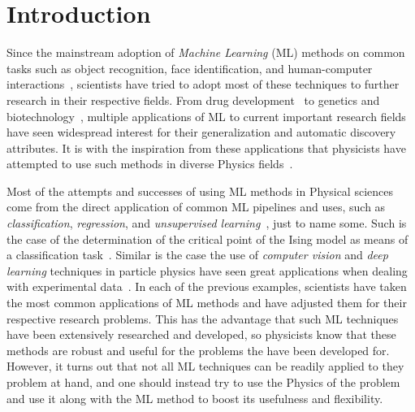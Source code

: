 \chapter{Introduction}
\label{Cap1}

Since the mainstream adoption of \emph{Machine Learning} (ML) methods
on common tasks such as object recognition, face identification,
and human-computer interactions~\cite{lecunDeepLearning2015},
scientists have tried to adopt most of these techniques to further research
in their respective fields. From drug development~\cite{redaMachineLearningApplications2020}
to genetics and biotechnology~\cite{libbrechtMachineLearningApplications2015},
multiple applications of ML to current important research fields have seen
widespread interest for their generalization and automatic discovery attributes.
It is with the inspiration from these applications that physicists have attempted to use 
such methods in diverse Physics fields~\cite{carleoMachineLearningPhysical2019a,dunjkoMachineLearningArtificial2018,carrasquillaMachineLearningPhases2017a}.

Most of the attempts and successes of using ML methods in Physical sciences come from
the direct application of common ML pipelines and uses, such as \emph{classification},
\emph{regression}, and \emph{unsupervised learning}~\cite{hastieElementsStatisticalLearning2009}, just to name some.
Such is the case of the determination of the
critical point of the Ising model as means of a classification task~\cite{carrasquillaMachineLearningPhases2017a}.
Similar is the case the use of \emph{computer vision} and \emph{deep learning} techniques in
particle physics have seen great applications when dealing with experimental data~\cite{radovicMachineLearningEnergy2018}.
In each of the previous examples, scientists have taken the most common applications
of ML methods and have adjusted them for their respective research problems.
This has the advantage that such ML techniques have been extensively researched
and developed, so physicists know that these methods are robust and useful for
the problems the have been developed for.
However, it turns out that not all ML techniques can be readily applied to they problem
at hand, and one should instead try to use the Physics of the problem and use it along
with the ML method to boost its usefulness and flexibility.

